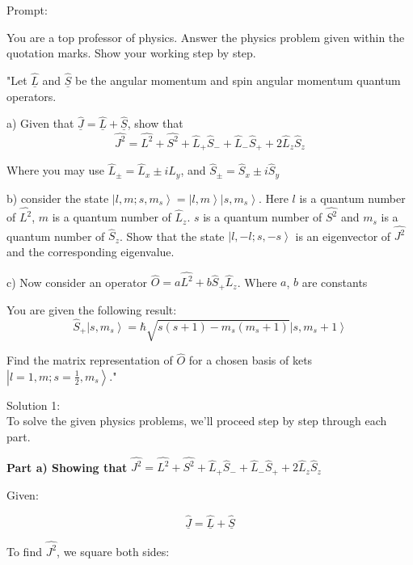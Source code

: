 \documentclass[a4paper,11pt]{article}
\begin{document}
Prompt:
\begin{spverbatim}
    You are a top professor of physics. Answer the physics problem given within the quotation marks. Show your working step by step.

    "Let \( \hat{\underline{L}} \) and \( \hat{\underline{S}} \) be the angular momentum and spin angular momentum quantum operators. 

    a) Given that \( \hat{\underline{J}} = \hat{\underline{L}} + \hat{\underline{S}} \), show that 
    \[ \hat{J^{2}} =  \hat{L^{2}} + \hat{S^{2}} + \hat{L}_{+}\hat{S}_{-} +  \hat{L}_{-}\hat{S}_{+} + 2\hat{L}_{z}\hat{S}_{z} \]

    Where you may use  \( \hat{L}_{\pm} = \hat{L}_{x} \pm i\hat{L}_{y} \), and \( \hat{S}_{\pm} = \hat{S}_{x} \pm i\hat{S}_{y} \)

    b) consider the state \( \left|l, m; s, m_{s} \right> = \left|l, m \right>\left|s, m_{s} \right> \). Here \( l \) is a quantum number of \( \hat{L^{2}} \), \( m \) is a quantum number of \( \hat{L}_{z} \). \( s \) is a quantum number of \( \hat{S^{2}} \) and \( m_{s} \) is a quantum number of \( \hat{S}_{z} \). Show that the state \( \left|l, -l; s, -s \right> \) is an eigenvector of \( \hat{J^{2}} \) and the corresponding eigenvalue. 

    c) Now consider an operator \( \hat{O} = a\hat{L^{2}} + b\hat{S}_{+}\hat{L}_{z} \). Where \( a \), \( b \) are constants

    You are given the following result:
    \[ \hat{S}_{+} \left|s, m_{s} \right> = \hbar \sqrt{s(s+1) - m_{s}(m_{s}+1)} \left|s, m_{s}+1 \right> \]

    Find the matrix representation of \( \hat{O} \) for a chosen basis of kets \( \left|l=1, m; s=\frac{1}{2}, m_{s} \right> \)."
\end{spverbatim}

\bigskip

\noindent Solution 1: \\

To solve the given physics problems, we'll proceed step by step through each part.

\textbf{Part a) Showing that} \( \hat{J^{2}} = \hat{L^{2}} + \hat{S^{2}} + \hat{L}_{+}\hat{S}_{-} + \hat{L}_{-}\hat{S}_{+} + 2\hat{L}_{z}\hat{S}_{z} \)

Given:

\[ \hat{\underline{J}} = \hat{\underline{L}} + \hat{\underline{S}} \]

To find \( \hat{J^{2}} \), we square both sides:
\end{document}
